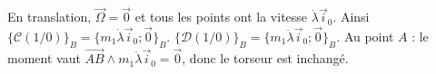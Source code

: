 \begin{corrigebox}
En translation, $\vec\Omega=\vec0$ et tous les points ont la vitesse
                $\dot\lambda\vec i_0$. Ainsi
                $\{\mathcal C(1/0)\}_B=\{m_1\dot\lambda\vec i_0;\vec0\}_B$.
$\{\mathcal D(1/0)\}_B=\{m_1\ddot\lambda\vec i_0;\vec0\}_B$.
                Au point $A$ : le moment vaut
                $\overrightarrow{AB}\wedge m_1\ddot\lambda\vec i_0=\vec0$, donc le
                torseur est inchangé.
\end{corrigebox}
